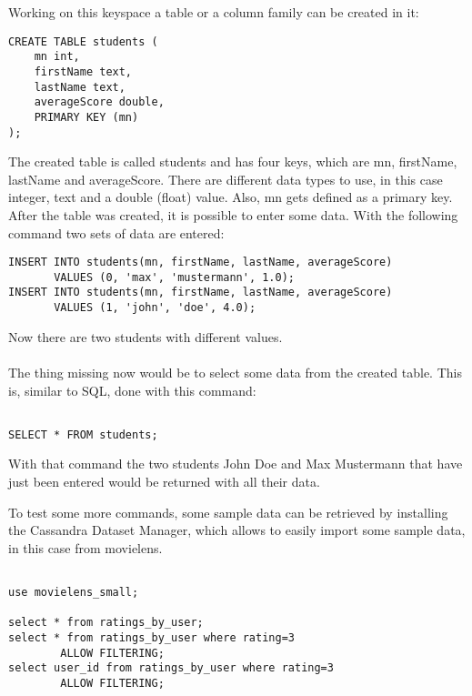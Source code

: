 Working on this keyspace a table or a column family can be created in it:
  \begin{lstlisting}
CREATE TABLE students (
    mn int,
    firstName text,
    lastName text,
    averageScore double,
    PRIMARY KEY (mn)
);
 \end{lstlisting}
The created table is called students and has four keys, which are mn, firstName, lastName and averageScore. There are different data types to use, in this case integer, text and a double (float) value. Also, mn gets defined as a primary key.
\\
After the table was created, it is possible to enter some data. With the following command two sets of data are entered:
  \begin{lstlisting}
INSERT INTO students(mn, firstName, lastName, averageScore) 
       VALUES (0, 'max', 'mustermann', 1.0);
INSERT INTO students(mn, firstName, lastName, averageScore) 
       VALUES (1, 'john', 'doe', 4.0);
 \end{lstlisting}
Now there are two students with different values.
 \\\\
The thing missing now would be to select some data from the created table. This is, similar to SQL, done with this command:
  \begin{lstlisting}

SELECT * FROM students;

 \end{lstlisting}
With that command the two students John Doe and Max Mustermann that have just been entered would be returned with all their data.

To test some more commands, some sample data can be retrieved by installing the Cassandra Dataset Manager, which allows to easily import some sample data, in this case from movielens.
  \begin{lstlisting}

use movielens_small;

select * from ratings_by_user;
select * from ratings_by_user where rating=3 
        ALLOW FILTERING;
select user_id from ratings_by_user where rating=3
        ALLOW FILTERING;
 \end{lstlisting}
 
